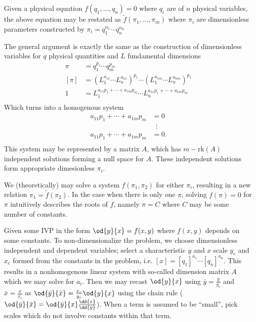   \item[Pi Theorem] Given a physical equation $f(q_1,\ldots,q_n)=0$ where $q_i$
    are of $n$ physical variables, the above equation may be restated as
    $\tilde{f}(\pi_1,\ldots,\pi_m)$ where $\pi_i$ are dimensionless parameters
    constructed by $\pi_i=q_1^{\alpha_1}\cdots q_n^{\alpha_n}$
  \item[Proof of Pi Theorem] The general argument is exactly the same as the
    construction of dimensionless variables for $q$ physical quantities and $L$
    fundamental dimensions
    \begin{equation*}
        \begin{aligned}
          \pi &= q_1^{p_1}\cdots q_m^{p_m} \\
          [\pi] &= {(L_1^{a_{11}}\cdots L_n^{a_{n1}})}^{p_1}\cdots
          {(L_1^{a_{1m}}\cdots L_n^{a_{nm}})}^{p_1} \\
          1 &= L_1^{a_{11}p_1+\cdots+a_{1m}p_m}\cdots L_n^{a_{11}p_1+\cdots+a_{1m}p_m} \\
        \end{aligned}
    \end{equation*}
    Which turns into a homogenous system
    \begin{equation*}
      \begin{aligned}
        a_{11}p_1+\cdots+a_{1m}p_m &= 0 \\
        &\;\;\vdots \\
        a_{11}p_1+\cdots+a_{1m}p_m &= 0. \\
      \end{aligned}
    \end{equation*}
    This system may be represented by a matrix $A$, which has $m-\text{rk}(A)$
    independent solutions forming a null space for $A$. These independent
    solutions form appropriate dimesionless $\pi_i$.
  \item[Pi Function Manipulation] We (theoretically) may solve a system
    $f(\pi_1, \pi_2)$ for either $\pi_i$, resulting in a new relation
    $\pi_1=\tilde{f}(\pi_2)$. In the case when there is only one $\pi$, solving
    $f(\pi)=0$ for $\pi$ intuitively describes the roots of $f$, namely $\pi=C$
    where $C$ may be some number of constants.
  \item[Non-Dimensionalization] Given some IVP in the form $\od{y}{x}=f(x,y)$
    where $f(x,y)$ depends on some constants. To non-dimensionalize the problem,
    we choose dimensionless independent and dependent variables; select a
    characteristic $y$ and $x$ scale $y_c$ and $x_c$ formed from the constants
    in the problem, i.e. $[x]={[q_1]}^{a_1}\cdots {[q_n]}^{a_n}$. This results
    in a nonhomogenous linear system with so-called dimension matrix $A$ which
    we may solve for $a_i$. Then we may recast $\od{y}{x}$ using
    $\bar{y}=\frac{y}{y_c}$ and $\bar{x}=\frac{x}{x_c}$ as
    $\od{\bar{y}}{\bar{x}}=\frac{x_c}{y_c}\od{y}{x}$ using the chain rule
    ($\od{\bar{y}}{\bar{x}}=\od{\bar{y}}{x}\frac{\dd{x}}{\dd{\bar{y}}}$). When a
    term is assumed to be ``small'', pick scales which do not involve constants
    within that term.

